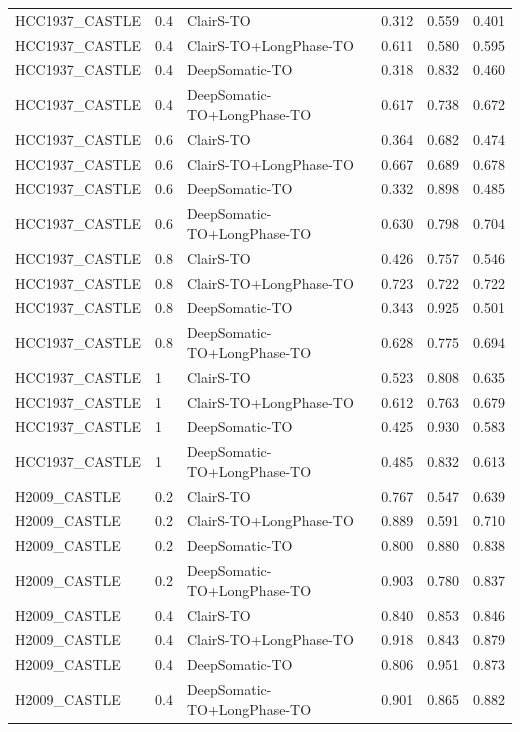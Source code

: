 \documentclass[pdflatex,sn-nature]{sn-jnl}
\begin{document}
{\begin{longtable}{@{}lllccc@{}}
  HCC1937\_CASTLE & 0.4 & ClairS-TO & 0.312 & 0.559 & 0.401 \\
  HCC1937\_CASTLE & 0.4 & ClairS-TO+LongPhase-TO & 0.611 & 0.580 & 0.595 \\
  HCC1937\_CASTLE & 0.4 & DeepSomatic-TO & 0.318 & 0.832 & 0.460 \\
  HCC1937\_CASTLE & 0.4 & DeepSomatic-TO+LongPhase-TO & 0.617 & 0.738 & 0.672 \\
  HCC1937\_CASTLE & 0.6 & ClairS-TO & 0.364 & 0.682 & 0.474 \\
  HCC1937\_CASTLE & 0.6 & ClairS-TO+LongPhase-TO & 0.667 & 0.689 & 0.678 \\
  HCC1937\_CASTLE & 0.6 & DeepSomatic-TO & 0.332 & 0.898 & 0.485 \\
  HCC1937\_CASTLE & 0.6 & DeepSomatic-TO+LongPhase-TO & 0.630 & 0.798 & 0.704 \\
  HCC1937\_CASTLE & 0.8 & ClairS-TO & 0.426 & 0.757 & 0.546 \\
  HCC1937\_CASTLE & 0.8 & ClairS-TO+LongPhase-TO & 0.723 & 0.722 & 0.722 \\
  HCC1937\_CASTLE & 0.8 & DeepSomatic-TO & 0.343 & 0.925 & 0.501 \\
  HCC1937\_CASTLE & 0.8 & DeepSomatic-TO+LongPhase-TO & 0.628 & 0.775 & 0.694 \\
  HCC1937\_CASTLE & 1 & ClairS-TO & 0.523 & 0.808 & 0.635 \\
  HCC1937\_CASTLE & 1 & ClairS-TO+LongPhase-TO & 0.612 & 0.763 & 0.679 \\
  HCC1937\_CASTLE & 1 & DeepSomatic-TO & 0.425 & 0.930 & 0.583 \\
  HCC1937\_CASTLE & 1 & DeepSomatic-TO+LongPhase-TO & 0.485 & 0.832 & 0.613 \\
  \addlinespace
  H2009\_CASTLE & 0.2 & ClairS-TO & 0.767 & 0.547 & 0.639 \\
  H2009\_CASTLE & 0.2 & ClairS-TO+LongPhase-TO & 0.889 & 0.591 & 0.710 \\
  H2009\_CASTLE & 0.2 & DeepSomatic-TO & 0.800 & 0.880 & 0.838 \\
  H2009\_CASTLE & 0.2 & DeepSomatic-TO+LongPhase-TO & 0.903 & 0.780 & 0.837 \\
  H2009\_CASTLE & 0.4 & ClairS-TO & 0.840 & 0.853 & 0.846 \\
  H2009\_CASTLE & 0.4 & ClairS-TO+LongPhase-TO & 0.918 & 0.843 & 0.879 \\
  H2009\_CASTLE & 0.4 & DeepSomatic-TO & 0.806 & 0.951 & 0.873 \\
  H2009\_CASTLE & 0.4 & DeepSomatic-TO+LongPhase-TO & 0.901 & 0.865 & 0.882 \\

\end{longtable}}
\end{document}
